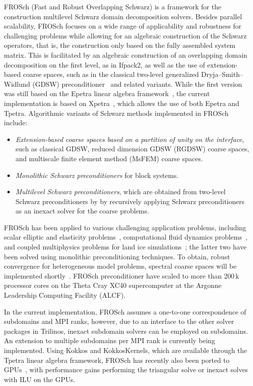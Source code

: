 FROSch (Fast and Robust Overlapping Schwarz) is a framework for the construction multilevel Schwarz domain decomposition solvers. Besides parallel scalability, FROSch focuses on a wide range of applicability and robustness for challenging problems while allowing for an algebraic construction of the Schwarz operators, that is, the construction only based on the fully assembled system matrix. This is facilitated by an algebraic construction of an overlapping domain decomposition on the first level, as in Ifpack2, as well as the use of extension-based coarse spaces, such as in the classical two-level generalized Dryja--Smith--Widlund (GDSW) preconditioner~\cite{dohrmann_domain_2008} and related variants. While the first version was still based on the Epetra linear algebra framework~\cite{heinlein_parallel_2016}, the current implementation is based on Xpetra~\cite{heinlein_frosch_2020}, which allows the use of both Epetra and Tpetra. Algorithmic variants of Schwarz methods implemented in FROSch include:
\begin{itemize}
	\item \emph{Extension-based coarse spaces based on a partition of unity on the interface}, such as classical GDSW, reduced dimension GDSW (RGDSW) coarse spaces, and multiscale finite element method (MsFEM) coarse spaces.
	\item \emph{Monolithic Schwarz preconditioners} for block systems.
	\item \emph{Multilevel Schwarz preconditioners}, which are obtained from two-level Schwarz preconditioners by by recursively applying Schwarz preconditioners as an inexact solver for the coarse problems.
\end{itemize}
FROSch has been applied to various challenging application problems, including scalar elliptic and elasticity problems~\cite{heinlein_parallel_2016}, computational fluid dynamics problems~\cite{heinlein_monolithic_2019}, and coupled multiphysics problems for land ice simulations~\cite{heinlein_frosch_2022}; the latter two have been solved using monolithic preconditioning techniques. To obtain, robust convergence for heterogeneous model problems, spectral coarse spaces will be implemented shortly~\cite{heinlein_adaptive_2019}. FROSch preconditioner have scaled to more than 200\,k processor cores on the Theta Cray XC40 supercomputer at the Argonne Leadership Computing Facility (ALCF). 

In the current implementation, FROSch assumes a one-to-one correspondence of subdomains and MPI ranks, however, due to an interface to the other solver packages in Trilinos, inexact subdomain solvers can be employed on subdomains. An extension to multiple subdomains per MPI rank is currently being implemented. Using Kokkos and KokkosKernels, which are available through the Tpetra linear algebra framework, FROSch has recently also been ported to GPUs~\cite{Yamazaki:2022:EST}, with performance gains performing the triangular solve or inexact solves with ILU on the GPUs.

